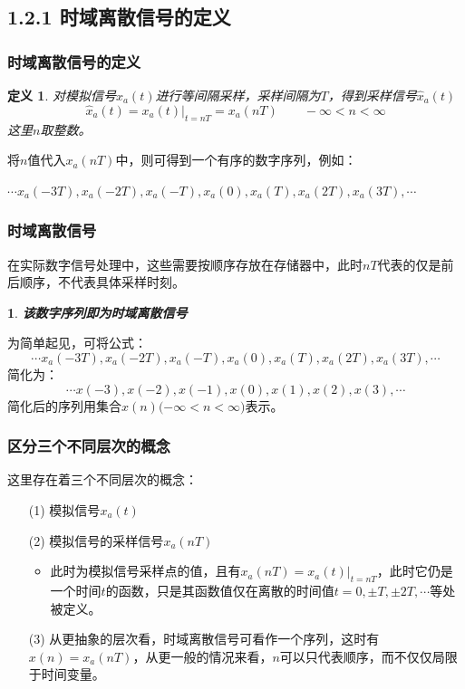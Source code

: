 \documentclass[notheorems,compress,mathserif,table]{beamer}
\newtheorem{definition}{定义}
\newtheorem{dablock}{}
\begin{document}
\subsection{1.2.1 时域离散信号的定义}
\begin{frame}[shrink]\frametitle{时域离散信号的定义}%
\begin{definition}
对模拟信号$x_{a}(t)$进行等间隔采样，采样间隔为$T$，得到采样信号$\hat{x}_{a}(t)$
\begin{equation*}
    \hat{x}_{a}(t) = x_{a}(t)|_{t=nT} = x_{a}(nT) \quad\quad -\infty<n<\infty
\end{equation*}
这里$n$取整数。
\end{definition}

将$n$值代入$x_{a}(nT)$中，则可得到一个有序的数字序列，例如：\par
$\cdots x_{a}(-3T),x_{a}(-2T),x_{a}(-T),x_{a}(0),x_{a}(T),x_{a}(2T),x_{a}(3T),\cdots$

\end{frame}
\begin{frame}[shrink]\frametitle{时域离散信号}%
在实际数字信号处理中，这些需要按顺序存放在存储器中，此时$nT$代表的仅是前后顺序，不代表具体采样时刻。
\begin{dablock}
\textbf{该数字序列即为时域离散信号}
\end{dablock}
为简单起见，可将公式：
$$\cdots x_{a}(-3T),x_{a}(-2T),x_{a}(-T),x_{a}(0),x_{a}(T),x_{a}(2T),x_{a}(3T),\cdots$$
简化为：
$$\cdots x(-3),x(-2),x(-1),x(0),x(1),x(2),x(3),\cdots$$
简化后的序列用集合${x(n)(-\infty<n<\infty})$表示。
\end{frame}
\begin{frame}[shrink]\frametitle{区分三个不同层次的概念}%
这里存在着三个不同层次的概念：
\begin{enumerate}
  \item [(1)]
        模拟信号$x_{a}(t)$
  \item [(2)]
        模拟信号的采样信号$x_{a}(nT)$
  \begin{itemize}
        \item
            此时为模拟信号采样点的值，且有$x_{a}(nT)= x_{a}(t)|_{t=nT}$，此时它仍是一个时间$t$的函数，只是其函数值仅在离散的时间值$t=0,\pm T,\pm 2T,\cdots$等处被定义。
      \end{itemize}
        \item [(3)]从更抽象的层次看，时域离散信号可看作一个序列，这时有$x(n)=x_{a}(nT)$，从更一般的情况来看，$n$可以只代表顺序，而不仅仅局限于时间变量。
\end{enumerate}
\end{frame}
\end{document}
